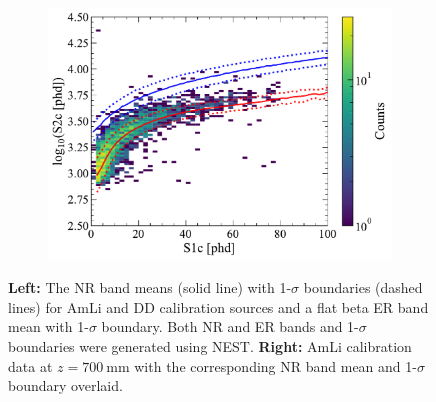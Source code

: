 \begin{enumerate}
\begin{figure}[!ht]
\begin{subfigure}[b]{0.49\textwidth}
        \includegraphics[width=\textwidth]{figures/VetoEfficiency/AmLi700_NRBands.pdf}
        \caption{}
        \label{fig:VetoEff/AmLi700_NRBands}
    \end{subfigure}
    \caption{\textbf{Left:} The NR band means (solid line) with 1-$\sigma$ boundaries (dashed lines) for AmLi and DD calibration sources and a flat beta ER band mean with 1-$\sigma$ boundary. Both NR and ER bands and 1-$\sigma$ boundaries were generated using NEST. \textbf{Right:} AmLi calibration data at $z=700~\text{mm}$ with the corresponding NR band mean and 1-$\sigma$ boundary overlaid.}
    \label{fig:VetoEff/SR3NRBands&AmLi700mmData}
\end{figure}
\end{enumerate}

